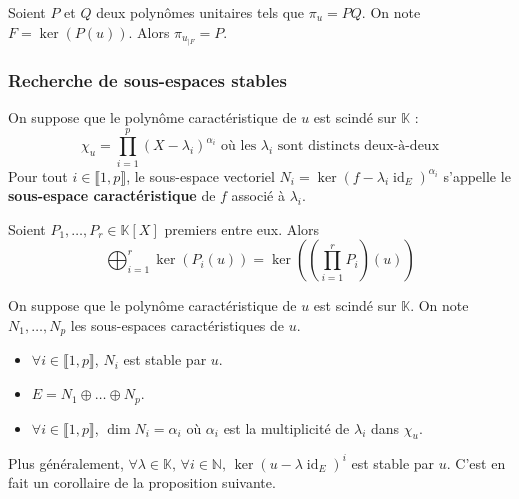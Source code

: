   \begin{proposition}
    Soient $P$ et $Q$ deux polynômes unitaires tels que $\pi_u = PQ$. On note $F = \ker{(P(u))}$. Alors $\pi_{u_{|F}} = P$.
  \end{proposition}

  \subsubsection{Recherche de sous-espaces stables}


  \begin{definition}
    On suppose que le polynôme caractéristique de $u$ est scindé sur $\mathbb{K}$ :
    \[ \chi_u = \prod_{i=1}^p (X - \lambda_i)^{\alpha_i} \text{ où les } \lambda_i \text{ sont distincts deux-à-deux} \]
    Pour tout $i \in \llbracket 1, p \rrbracket$, le sous-espace vectoriel $N_i = \ker{(f - \lambda_i \operatorname{id}_E)^{\alpha_i}}$ s'appelle le \textbf{sous-espace caractéristique} de $f$ associé à $\lambda_i$.
  \end{definition}


  \begin{proposition}
    Soient $P_1, \dots, P_r \in \mathbb{K}[X]$ premiers entre eux. Alors
    \[ \bigoplus_{i=1}^r \ker{(P_i(u))} = \ker \left( \left( \prod_{i=1}^r P_i \right) \left ( u \right) \right) \]
  \end{proposition}


  \begin{proposition}
    On suppose que le polynôme caractéristique de $u$ est scindé sur $\mathbb{K}$. On note $N_1, \dots, N_p$ les sous-espaces caractéristiques de $u$.
    \begin{itemize}
      \item $\forall i \in \llbracket 1, p \rrbracket$, $N_i$ est stable par $u$.
      \item $E = N_1 \oplus \dots \oplus N_p$.
      \item $\forall i \in \llbracket 1, p \rrbracket$, $\dim{N_i} = \alpha_i$ où $\alpha_i$ est la multiplicité de $\lambda_i$ dans $\chi_u$.
    \end{itemize}
  \end{proposition}


  \begin{remark}
    Plus généralement, $\forall \lambda \in \mathbb{K}, \, \forall i \in \mathbb{N}, \, \ker{(u - \lambda \operatorname{id}_E)^i}$ est stable par $u$. C'est en fait un corollaire de la proposition suivante.
  \end{remark}


